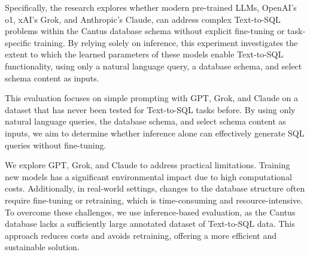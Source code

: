 Specifically, the research explores whether modern pre-trained LLMs, OpenAI’s o1, xAI’s Grok, and Anthropic’s Claude, can address complex Text-to-SQL problems within the Cantus database schema without explicit fine-tuning or task-specific training. By relying solely on inference, this experiment investigates the extent to which the learned parameters of these models enable Text-to-SQL functionality, using only a natural language query, a database schema, and select schema content as inputs.


This evaluation focuses on simple prompting with GPT, Grok, and Claude on a dataset that has never been tested for Text-to-SQL tasks before. By using only natural language queries, the database schema, and select schema content as inputs, we aim to determine whether inference alone can effectively generate SQL queries without fine-tuning.

We explore GPT, Grok, and Claude to address practical limitations. Training new models has a significant environmental impact due to high computational costs. Additionally, in real-world settings, changes to the database structure often require fine-tuning or retraining, which is time-consuming and resource-intensive. To overcome these challenges, we use inference-based evaluation, as the Cantus database lacks a sufficiently large annotated dataset of Text-to-SQL data. This approach reduces costs and avoids retraining, offering a more efficient and sustainable solution.
